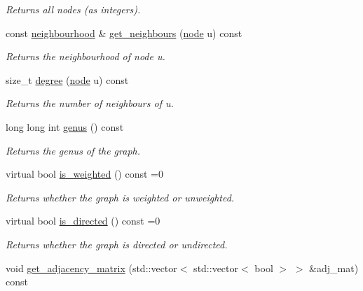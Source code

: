 \begin{DoxyCompactItemize}
\begin{DoxyCompactList}\small\item\em Returns all nodes (as integers). \end{DoxyCompactList}\item 
const \hyperlink{namespacelgraph_a052e7766c13f3a43cec0aec8173fdede}{neighbourhood} \& \hyperlink{classlgraph_1_1xxgraph_a8b6d2d8126d39fc4167e9b93af78d5fc}{get\-\_\-neighbours} (\hyperlink{namespacelgraph_a397169dd66adf725210a30fb7251773e}{node} u) const 
\begin{DoxyCompactList}\small\item\em Returns the neighbourhood of node u. \end{DoxyCompactList}\item 
size\-\_\-t \hyperlink{classlgraph_1_1xxgraph_a3106eaa7cc937f414c2281e542264883}{degree} (\hyperlink{namespacelgraph_a397169dd66adf725210a30fb7251773e}{node} u) const 
\begin{DoxyCompactList}\small\item\em Returns the number of neighbours of u. \end{DoxyCompactList}\item 
long long int \hyperlink{classlgraph_1_1xxgraph_ae758b0403a8a1d9b82a8859608f4049c}{genus} () const 
\begin{DoxyCompactList}\small\item\em Returns the genus of the graph. \end{DoxyCompactList}\item 
virtual bool \hyperlink{classlgraph_1_1xxgraph_a0bd329c5dcbded569658b59462a08acf}{is\-\_\-weighted} () const =0
\begin{DoxyCompactList}\small\item\em Returns whether the graph is weighted or unweighted. \end{DoxyCompactList}\item 
virtual bool \hyperlink{classlgraph_1_1xxgraph_a0a606d77cbbb2efa7056b82c3b8c395c}{is\-\_\-directed} () const =0
\begin{DoxyCompactList}\small\item\em Returns whether the graph is directed or undirected. \end{DoxyCompactList}\item 
\hypertarget{classlgraph_1_1xxgraph_a4161a548022795a068af53c76d504391}{void \hyperlink{classlgraph_1_1xxgraph_a4161a548022795a068af53c76d504391}{get\-\_\-adjacency\-\_\-matrix} (std\-::vector$<$ std\-::vector$<$ bool $>$ $>$ \&adj\-\_\-mat) const }\label{classlgraph_1_1xxgraph_a4161a548022795a068af53c76d504391}


\end{DoxyCompactItemize}
